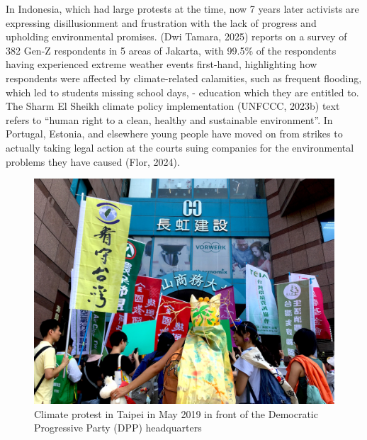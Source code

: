 \documentclass[
  12pt,
  letterpaper,
  DIV=11,
  numbers=noendperiod]{scrartcl}
\begin{document}
In Indonesia, which had large protests at the time, now 7 years later
activists are expressing disillusionment and frustration with the lack
of progress and upholding environmental promises. (Dwi Tamara, 2025)
reports on a survey of 382 Gen-Z respondents in 5 areas of Jakarta, with
99.5\% of the respondents having experienced extreme weather events
first-hand, highlighting how respondents were affected by
climate-related calamities, such as frequent flooding, which led to
students missing school days, - education which they are entitled to.
The Sharm El Sheikh climate policy implementation (UNFCCC, 2023b) text
refers to ``human right to a clean, healthy and sustainable
environment''. In Portugal, Estonia, and elsewhere young people have
moved on from strikes to actually taking legal action at the courts
suing companies for the environmental problems they have caused (Flor,
2024).

\begin{figure}[H]

{\centering \includegraphics[width=1\linewidth,height=\textheight,keepaspectratio]{./images/college/taipei.jpg}

}

\caption{Climate protest in Taipei in May 2019 in front of the
Democratic Progressive Party (DPP) headquarters}

\end{figure}%
\end{document}
